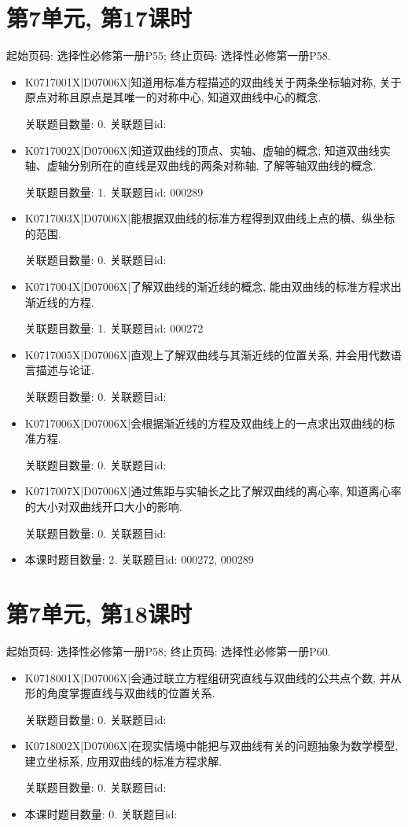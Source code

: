 \section*{第7单元, 第17课时}
起始页码: 选择性必修第一册P55; 终止页码: 选择性必修第一册P58.
\begin{itemize}
\item K0717001X|D07006X|知道用标准方程描述的双曲线关于两条坐标轴对称, 关于原点对称且原点是其唯一的对称中心, 知道双曲线中心的概念.

关联题目数量: 0. 关联题目id: 

\item K0717002X|D07006X|知道双曲线的顶点、实轴、虚轴的概念, 知道双曲线实轴、虚轴分别所在的直线是双曲线的两条对称轴, 了解等轴双曲线的概念.

关联题目数量: 1. 关联题目id: 000289

\item K0717003X|D07006X|能根据双曲线的标准方程得到双曲线上点的横、纵坐标的范围.

关联题目数量: 0. 关联题目id: 

\item K0717004X|D07006X|了解双曲线的渐近线的概念, 能由双曲线的标准方程求出渐近线的方程.

关联题目数量: 1. 关联题目id: 000272

\item K0717005X|D07006X|直观上了解双曲线与其渐近线的位置关系, 并会用代数语言描述与论证.

关联题目数量: 0. 关联题目id: 

\item K0717006X|D07006X|会根据渐近线的方程及双曲线上的一点求出双曲线的标准方程.

关联题目数量: 0. 关联题目id: 

\item K0717007X|D07006X|通过焦距与实轴长之比了解双曲线的离心率, 知道离心率的大小对双曲线开口大小的影响.

关联题目数量: 0. 关联题目id: 

\item 本课时题目数量: 2. 关联题目id: 000272, 000289

\end{itemize}

\section*{第7单元, 第18课时}
起始页码: 选择性必修第一册P58; 终止页码: 选择性必修第一册P60.
\begin{itemize}
\item K0718001X|D07006X|会通过联立方程组研究直线与双曲线的公共点个数, 并从形的角度掌握直线与双曲线的位置关系.

关联题目数量: 0. 关联题目id: 

\item K0718002X|D07006X|在现实情境中能把与双曲线有关的问题抽象为数学模型, 建立坐标系, 应用双曲线的标准方程求解.

关联题目数量: 0. 关联题目id: 

\item 本课时题目数量: 0. 关联题目id: 

\end{itemize}

